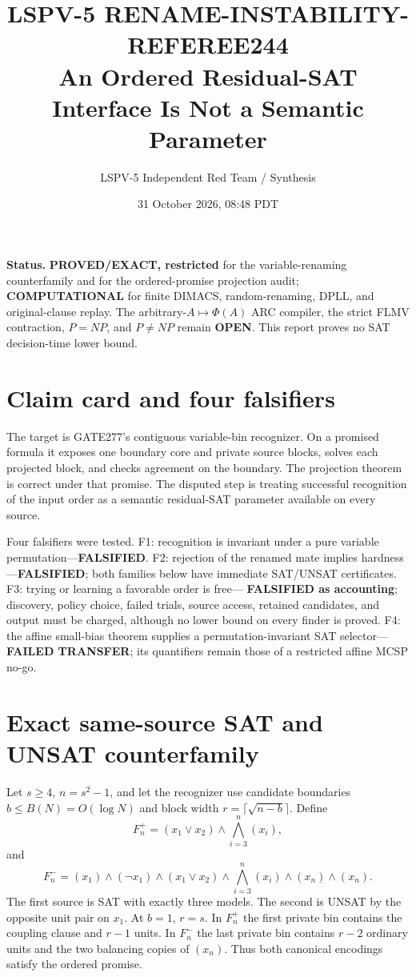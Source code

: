 \documentclass[11pt]{article}
\title{LSPV-5 RENAME-INSTABILITY-REFEREE244\\
An Ordered Residual-SAT Interface Is Not a Semantic Parameter}
\author{LSPV-5 Independent Red Team / Synthesis}
\date{31 October 2026, 08:48 PDT}
\begin{document}
\maketitle

\noindent\textbf{Status.}
\textbf{PROVED/EXACT, restricted} for the variable-renaming counterfamily and
for the ordered-promise projection audit; \textbf{COMPUTATIONAL} for finite
DIMACS, random-renaming, DPLL, and original-clause replay.  The
arbitrary-$A\mapsto\Phi(A)$ ARC compiler, the strict FLMV contraction,
$P=NP$, and $P\ne NP$ remain \textbf{OPEN}.  This report proves no SAT
decision-time lower bound.

\section{Claim card and four falsifiers}
The target is GATE277's contiguous variable-bin recognizer.  On a promised
formula it exposes one boundary core and private source blocks, solves each
projected block, and checks agreement on the boundary.  The projection theorem
is correct under that promise.  The disputed step is treating successful
recognition of the input order as a semantic residual-SAT parameter available
on every source.

Four falsifiers were tested.  F1: recognition is invariant under a pure
variable permutation---\textbf{FALSIFIED}.  F2: rejection of the renamed mate
implies hardness---\textbf{FALSIFIED}; both families below have immediate
SAT/UNSAT certificates.  F3: trying or learning a favorable order is free---
\textbf{FALSIFIED as accounting}; discovery, policy choice, failed trials,
source access, retained candidates, and output must be charged, although no
lower bound on every finder is proved.  F4: the affine small-bias theorem
supplies a permutation-invariant SAT selector---\textbf{FAILED TRANSFER}; its
quantifiers remain those of a restricted affine MCSP no-go.

\section{Exact same-source SAT and UNSAT counterfamily}
Let $s\ge4$, $n=s^2-1$, and let the recognizer use candidate boundaries
$b\le B(N)=O(\log N)$ and block width
$r=\lceil\sqrt{n-b}\rceil$.  Define
\[
 F_n^+=(x_1\vee x_2)\wedge\bigwedge_{i=3}^{n}(x_i),
\]
and
\[
 F_n^-=(x_1)\wedge(\neg x_1)\wedge(x_1\vee x_2)
 \wedge\bigwedge_{i=3}^{n}(x_i)\wedge(x_n)\wedge(x_n).
\]
The first source is SAT with exactly three models.  The second is UNSAT by the
opposite unit pair on $x_1$.  At $b=1$, $r=s$.  In $F_n^+$ the first private
bin contains the coupling clause and $r-1$ units.  In $F_n^-$ the last private
bin contains $r-2$ ordinary units and the two balancing copies of $(x_n)$.
Thus both canonical encodings satisfy the ordered promise.
\end{document}
